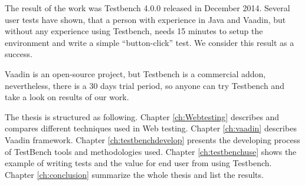 	  The result of the work was Testbench 4.0.0 released in December 2014.
	  Several user tests have shown, that a person with experience in Java and
	  Vaadin, but without any experience using Testbench, needs 15 minutes to setup
	  the environment and write a simple ``button-click'' test. We consider this
	  result as a success.
	  
	  Vaadin is an open-source project, but Testbench is a commercial
	  addon, nevertheless, there is a 30 days trial period, so anyone
	  can try Testbench and take a look on results of our work.
	  
	  \iffalse
		  I will also , because Testbench is focused on testing Web
		 applications written with Vaadin. I will also describe the working flow, what
		 tools and methodologies the team used and how the final product helps
		 Vaadin developers.
	  \fi

	  The thesis is structured as following. Chapter \ref{ch:Webtesting}
	  describes and compares different techniques used in Web testing.
	  Chapter \ref{ch:vaadin} describes Vaadin framework.
	  Chapter \ref{ch:testbenchdevelop} presents the developing process of
	  TestBench tools and methodologies used. Chapter \ref{ch:testbenchuse} shows the example of writing tests and the value for
	  end user from using Testbench. Chapter \ref{ch:conclusion} summarize the whole
	  thesis and list the results.